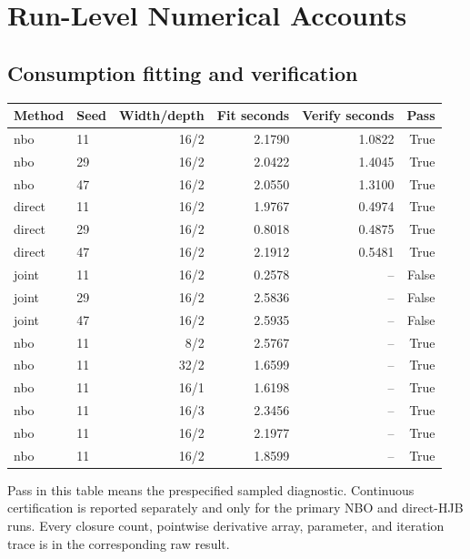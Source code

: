 \section{Run-Level Numerical Accounts}
\subsection{Consumption fitting and verification}
\begingroup\footnotesize\setlength{\tabcolsep}{4pt}
\begin{longtable}{llrrrr}
\toprule Method & Seed & Width/depth & Fit seconds & Verify seconds & Pass\\\midrule\endhead
nbo & 11 & 16/2 & 2.1790 & 1.0822 & True\\
nbo & 29 & 16/2 & 2.0422 & 1.4045 & True\\
nbo & 47 & 16/2 & 2.0550 & 1.3100 & True\\
direct & 11 & 16/2 & 1.9767 & 0.4974 & True\\
direct & 29 & 16/2 & 0.8018 & 0.4875 & True\\
direct & 47 & 16/2 & 2.1912 & 0.5481 & True\\
joint & 11 & 16/2 & 0.2578 & -- & False\\
joint & 29 & 16/2 & 2.5836 & -- & False\\
joint & 47 & 16/2 & 2.5935 & -- & False\\
nbo & 11 & 8/2 & 2.5767 & -- & True\\
nbo & 11 & 32/2 & 1.6599 & -- & True\\
nbo & 11 & 16/1 & 1.6198 & -- & True\\
nbo & 11 & 16/3 & 2.3456 & -- & True\\
nbo & 11 & 16/2 & 2.1977 & -- & True\\
nbo & 11 & 16/2 & 1.8599 & -- & True\\
\bottomrule\end{longtable}\endgroup
Pass in this table means the prespecified sampled diagnostic. Continuous certification is reported separately and only for the primary NBO and direct-HJB runs. Every closure count, pointwise derivative array, parameter, and iteration trace is in the corresponding raw result.
